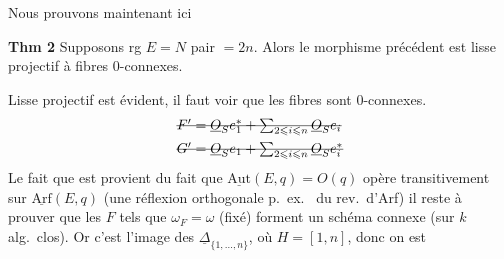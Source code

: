 \documentclass[11pt,a4paper]{article}
\begin{document}
Nous prouvons maintenant ici 

\textbf{Thm 2} Supposons rg $E = N$ pair $= 2n$. Alors le morphisme précédent est
lisse projectif à fibres  $0$-connexes.

Lisse projectif est évident, il faut voir que les fibres  sont
$0$-connexes. 
\[
\begin{aligned}
  &\text{\struck{$F' = \underline{O}_S e_1^{*} + \sum_{2 \leqslant i \leqslant n} \underline{O}_S e_i$}} \\
  &\text{\struck{$G' = \underline{O}_S e_1 + \sum_{2 \leqslant i \leqslant n} \underline{O}_S e_i^{*}$}}
\end{aligned}
\]
Le fait que  est  provient du fait que
$\underline{\mathrm{Aut}}(E,q) = O(q)$ opère transitivement sur
$\underline{\mathrm{Arf}}(E,q)$ (une réflexion orthogonale p.\ ex.\ \struck{\ill{}}
 \struck{\ill{}} du rev.\ d'Arf) il reste à prouver que
les   $F$ tels que
$\omega_F = \omega$ (fixé)  forment un schéma connexe (sur $k$
alg.\ clos). Or c'est l'image des $\underline{\Delta}_{\{1, \ldots, n\}}$, où
$H = [1,n]$, donc on est
\end{document}
